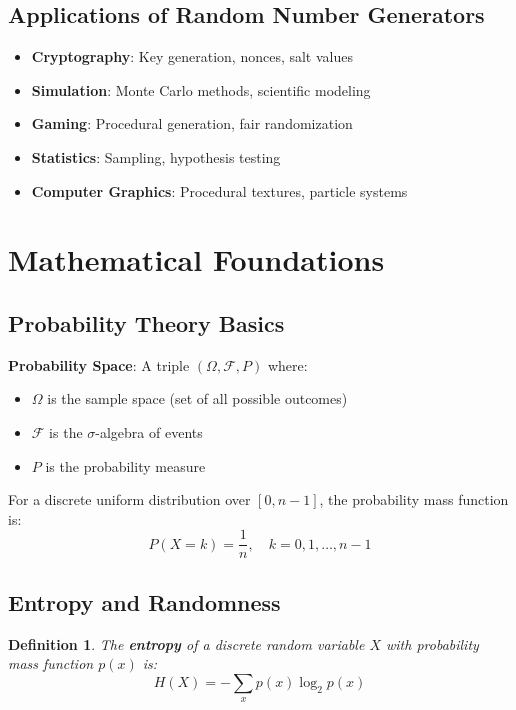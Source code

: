 \documentclass[11pt,a4paper]{article}
\newtheorem{definition}[theorem]{Definition}
\begin{document}
\subsection{Applications of Random Number Generators}

\begin{itemize}
    \item \textbf{Cryptography}: Key generation, nonces, salt values
    \item \textbf{Simulation}: Monte Carlo methods, scientific modeling
    \item \textbf{Gaming}: Procedural generation, fair randomization
    \item \textbf{Statistics}: Sampling, hypothesis testing
    \item \textbf{Computer Graphics}: Procedural textures, particle systems
\end{itemize}

\section{Mathematical Foundations}

\subsection{Probability Theory Basics}

\begin{mathbox}
\textbf{Probability Space}: A triple $(\Omega, \mathcal{F}, P)$ where:
\begin{itemize}
    \item $\Omega$ is the sample space (set of all possible outcomes)
    \item $\mathcal{F}$ is the $\sigma$-algebra of events
    \item $P$ is the probability measure
\end{itemize}
\end{mathbox}

For a discrete uniform distribution over $[0, n-1]$, the probability mass function is:
\[P(X = k) = \frac{1}{n}, \quad k = 0, 1, \ldots, n-1\]

\subsection{Entropy and Randomness}

\begin{definition}
The \textbf{entropy} of a discrete random variable $X$ with probability mass function $p(x)$ is:
\[H(X) = -\sum_{x} p(x) \log_2 p(x)\]
\end{definition}
\end{document}
